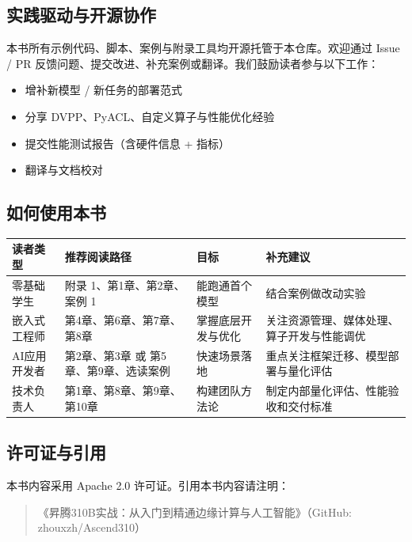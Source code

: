 \subsection*{实践驱动与开源协作}\label{src-book-README-h7}

本书所有示例代码、脚本、案例与附录工具均开源托管于本仓库。欢迎通过 Issue
/ PR 反馈问题、提交改进、补充案例或翻译。我们鼓励读者参与以下工作：

\begin{itemize}
\tightlist
\item
  增补新模型 / 新任务的部署范式
\item
  分享 DVPP、PyACL、自定义算子与性能优化经验
\item
  提交性能测试报告（含硬件信息 + 指标）
\item
  翻译与文档校对
\end{itemize}

\subsection*{如何使用本书}\label{src-book-README-h8}

\begin{longtable}[]{@{}
  >{\raggedright\arraybackslash}p{}
  >{\raggedright\arraybackslash}p{}
  >{\raggedright\arraybackslash}p{}
  >{\raggedright\arraybackslash}p{}@{}}
\toprule\noalign{}
\begin{minipage}[b]{\linewidth}\raggedright
读者类型
\end{minipage} & \begin{minipage}[b]{\linewidth}\raggedright
推荐阅读路径
\end{minipage} & \begin{minipage}[b]{\linewidth}\raggedright
目标
\end{minipage} & \begin{minipage}[b]{\linewidth}\raggedright
补充建议
\end{minipage} \\
\midrule\noalign{}
\endhead
\bottomrule\noalign{}
\endlastfoot
零基础学生 & 附录 1、第1章、第2章、案例 1 & 能跑通首个模型 &
结合案例做改动实验 \\
嵌入式工程师 & 第4章、第6章、第7章、第8章 & 掌握底层开发与优化 &
关注资源管理、媒体处理、算子开发与性能调优 \\
AI应用开发者 & 第2章、第3章 或 第5章、第9章、选读案例 & 快速场景落地 &
重点关注框架迁移、模型部署与量化评估 \\
技术负责人 & 第1章、第8章、第9章、第10章 & 构建团队方法论 &
制定内部量化评估、性能验收和交付标准 \\
\end{longtable}

\subsection*{许可证与引用}\label{src-book-README-h9}

本书内容采用 Apache 2.0 许可证。引用本书内容请注明：

\begin{quote}
《昇腾310B实战：从入门到精通边缘计算与人工智能》（GitHub:
zhouxzh/Ascend310）
\end{quote}
